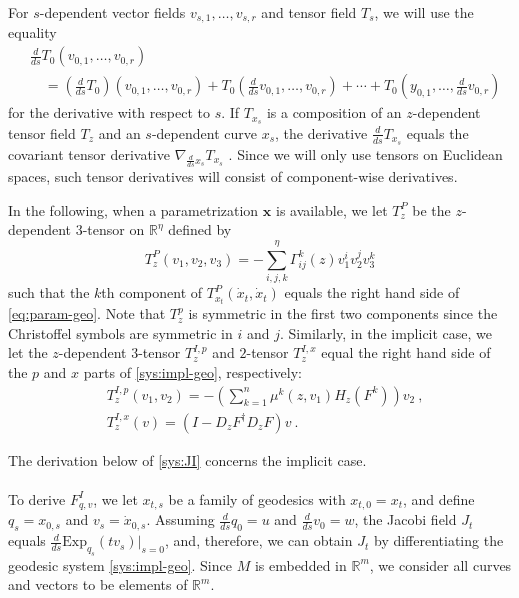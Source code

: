 \documentclass[final]{svjour3}
\newcommand{\RR}{\mathbb{R}}
\newcommand{\df}[2]{\tfrac{d}{d#2} #1}
\newcommand{\sdf}[2]{\scriptscriptstyle\frac{d}{d#2} #1}
\newcommand{\Exp}{\mathrm{Exp}}
\newcommand{\Hess}{H}
\newcommand{\param}[1]{\mathbf{#1}}
\begin{document}
For $s$-dependent vector fields $v_{s,1},\ldots,v_{s,r}$ and tensor field $T_s$,
we will use the equality
\begin{equation}
    \begin{split}
    &\df{T_0(v_{0,1},\ldots,v_{0,r})}{s}
    \\
    &\quad=
    \left(\df{T_0}{s}\right)(v_{0,1},\ldots,v_{0,r})
    +
    T_0(\df{v_{0,1}}{s},\ldots,v_{0,r})
    +\cdots+
    T_0(y_{0,1},\ldots,\df{v_{0,r}}{s})
    \end{split}
    \label{eq:t-deriv}
\end{equation}
for the derivative with respect to $s$.
If $T_{x_s}$ is a composition of an $z$-dependent tensor field $T_z$ and an
$s$-dependent curve $x_s$, the derivative $\df{T_{x_s}}{s}$ equals the
covariant tensor derivative $\nabla_{\sdf{x_s}{s}}T_{x_s}$ \cite[Chap.  4]{do_carmo_riemannian_1992}.
Since we will only use tensors on Euclidean spaces, such tensor derivatives 
will consist of component-wise derivatives.

In the following, when a parametrization $\param{x}$ is available, we let $T_z^P$ be the $z$-dependent $3$-tensor on
$\RR^\eta$ defined by
\begin{equation*}
    T_z^P(v_1,v_2,v_3)
    =
    -\sum_{i,j,k}^\eta\Gamma_{ij}^k(z)v_1^iv_2^jv_3^k
\end{equation*}
such that the $k$th component of $T_{x_t}^P(\dot{x}_t,\dot{x}_t)$
equals the right hand side of \eqref{eq:param-geo}. Note that $T_z^p$ is symmetric
in the first two components since the Christoffel symbols are symmetric in $i$
and $j$. Similarly, in the implicit case, we let
the $z$-dependent $3$-tensor $T_z^{I,p}$ and $2$-tensor $T_z^{I,x}$ equal the right hand side of the $p$ and
$x$ parts of \eqref{sys:impl-geo}, respectively:
\begin{align*}
    &T_z^{I,p}(v_1,v_2)
    =-\left(\sum_{k=1}^n\mu^k(z,v_1)\Hess_{z}(F^k)\right)v_2\ ,\\
    &T_z^{I,x}(v)
    =
    \left(I-D_{z}F^\dagger D_{z}F\right)v
    \ .
\end{align*}

The derivation below of \eqref{sys:JI} concerns the implicit case.
\\\ \\
    To derive $F_{q,v}^I$, we let $x_{t,s}$ be a family of geodesics with
    $x_{t,0}=x_t$, and define
    $q_s=x_{0,s}$ and $v_s=\dot{x}_{0,s}$. Assuming $\df{q_0}{s}=u$ and $\df{v_0}{s}=w$,
    the Jacobi field $J_t$ equals $\df{\Exp_{q_s}(tv_s)}{s}|_{s=0}$, 
    and, therefore, we can obtain $J_t$ by differentiating the 
    geodesic system \eqref{sys:impl-geo}. Since $M$ is embedded in $\RR^m$, we
    consider all curves and vectors to be elements of $\RR^m$.
\end{document}

